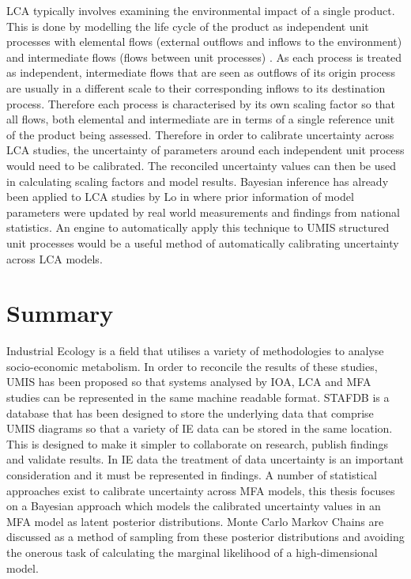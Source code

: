 \documentclass[ %
                    author={Tom Jager},
                supervisor={Dr. Daniel Schien},
                    degree={MEng},
                     title={A Bayesian Inference Engine for Calibrating Uncertainty over UMIS Structured MFA Systems},
                  subtitle={},
                      type={research},
                      year={2019} ]{dissertation}
\begin{document}
LCA typically involves examining the environmental impact of a single product. This is done by modelling the life cycle of the product as independent unit processes with elemental flows (external outflows and inflows to the environment) and intermediate flows (flows between unit processes) \cite{heijungs2013computational}. As each process is treated as independent, intermediate flows that are seen as outflows of its origin process are usually in a different scale to their corresponding inflows to its destination process. Therefore each process is characterised by its own scaling factor so that all flows, both elemental and intermediate are in terms of a single reference unit of the product being assessed. Therefore in order to calibrate uncertainty across LCA studies, the uncertainty of parameters around each independent unit process would need to be calibrated. The reconciled uncertainty values can then be used in calculating scaling factors and model results. Bayesian inference has already been applied to LCA studies by Lo in \cite{lo2005quantifying} where prior information of model parameters were updated by real world measurements and findings from national statistics. An engine to automatically apply this technique to UMIS structured unit processes would be a useful method of automatically calibrating uncertainty across LCA models.

\section{Summary}
Industrial Ecology is a field that utilises a variety of methodologies to analyse socio-economic metabolism. In order to reconcile the results of these studies, UMIS has been proposed so that systems analysed by IOA, LCA and MFA studies can be represented in the same machine readable format. STAFDB is a database that has been designed to store the underlying data that comprise UMIS diagrams so that a variety of IE data can be stored in the same location. This is designed to make it simpler to collaborate on research, publish findings and validate results. In IE data the treatment of data uncertainty is an important consideration and it must be represented in findings. A number of statistical approaches exist to calibrate uncertainty across MFA models, this thesis focuses on a Bayesian approach which models the calibrated uncertainty values in an MFA model as latent posterior distributions. Monte Carlo Markov Chains are discussed as a method of sampling from these posterior distributions and avoiding the onerous task of calculating the marginal likelihood of a high-dimensional model.
\end{document}
